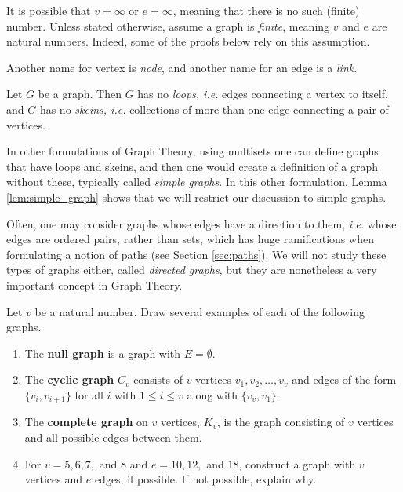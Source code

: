 \begin{remark} It is possible that $v=\infty$ or $e=\infty$, meaning that there is no such (finite) number.  Unless stated otherwise, assume a graph is \textit{finite}, meaning $v$ and $e$ are natural numbers.  Indeed, some of the proofs below rely on this assumption.

Another name for vertex is \textit{node}, and another name for an edge is a \textit{link}.
\end{remark}


\begin{lemma} \label{lem:simple_graph}Let $G$ be a graph.  Then $G$ has no \textit{loops, i.e.} edges connecting a vertex to itself, and $G$ has no \textit{skeins, i.e.} collections of more than one edge connecting a pair of vertices.
\end{lemma}

\begin{remark} In other formulations of Graph Theory, using multisets one can define graphs that have loops and skeins, and then one would create a definition of a graph without these, typically called \textit{simple graphs}.  In this other formulation, Lemma \ref{lem:simple_graph} shows that we will restrict our discussion to simple graphs.

Often, one may consider graphs whose edges have a direction to them, \textit{i.e.} whose edges are ordered pairs, rather than sets, which has huge ramifications when formulating a notion of paths (see Section \ref{sec:paths}).  We will not study these types of graphs either, called \textit{directed graphs}, but they are nonetheless a very important concept in Graph Theory.
\end{remark}

\begin{examples} Let $v$ be a natural number.  Draw several examples of each of the following graphs.
    \begin{enumerate}
        \item The \textbf{null graph} is a graph with $E=\emptyset$.
        \item The \textbf{cyclic graph} $C_v$ consists of $v$ vertices $v_1, v_2, \ldots, v_v$ and edges of the form $\{v_i, v_{i+1}\}$ for all $i$ with $1\leq i \leq v$ along with $\{v_v, v_1\}$.
        \item The \textbf{complete graph} on $v$ vertices, $K_v$, is the graph consisting of $v$ vertices and all possible edges between them.
        \item For $v = 5,6,7,$ and $8$ and $e=10, 12, $ and $18$, construct a graph with $v$ vertices and $e$ edges, if possible.  If not possible, explain why.
    \end{enumerate}
\end{examples}

